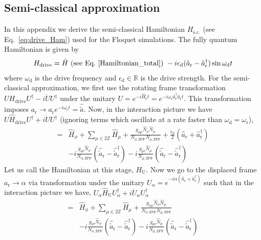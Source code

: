 \documentclass[%
reprint,
superscriptaddress,
 amsmath,amssymb,
 aps,
 prx,
longbibliography,
floatfix,
]{revtex4-2}
\begin{document}
{\subsection{Semi-classical approximation}\label{app:semi-classical}
In this appendix we derive the semi-classical Hamiltonian $H_\textrm{s.c.}$ (see Eq.~\ref{eq:drive_Ham}) used for the Floquet simulations. The fully quantum Hamiltonian is given by 
\begin{align}
    H_\textrm{drive}=\hat H \textrm{ (see Eq.~\ref{Hamiltonian_total}) }-i\epsilon_\textrm{d}(\hat a_\textrm{r}-\hat a_\textrm{r}^\dagger)\sin{\omega_\textrm{d} t}
\end{align}
where $\omega_\textrm{d}$ is the drive frequency and $\epsilon_\textrm{d}\in \mathbb{R}$ is the drive strength. For the semi-classical approximation, we first use the rotating frame transformation $UH_\textrm{drive}U^\dagger-i\dot{U}U^\dagger$ under the unitary $U=e^{-i\hat H_\textrm{r}t}=e^{-i\omega_\textrm{r} \hat a_\textrm{r}^\dagger \hat a_\textrm{r}t}$. This transformation imposes $a_\textrm{r}\rightarrow a_\textrm{r}e^{-i\omega_\textrm{r}t}=\hat{\tilde{a}}$. Now, in the interaction picture we have $U\hat H_\textrm{drive}U^\dagger+i\dot{U}U^\dagger$ (ignoring terms which oscillate at a rate faster than $\omega_\textrm{d}=\omega_\textrm{r}$),
\begin{align}
   =&\hat H_\phi+\sum_{\mu\in 2\mathbb{Z}}\hat H_\mu+\frac{g_{\phi\mu}\hat N_\phi\hat N_\mu}{N_{\phi,\textrm{ZPF}}N_{\mu,\textrm{ZPF}}}+\frac{\epsilon_\textrm{d}}{2}(\hat a_\textrm{r}+\hat a_\textrm{r}^\dagger)\nonumber\\ 
   &-i\frac{g_{\phi\textrm{r}}\hat N_\phi}{N_{\phi,\textrm{ZPF}}}(\hat {\tilde{a}}_\textrm{r}-\hat {\tilde{a}}_\textrm{r}^\dagger)-i\frac{g_{\mu\textrm{r}}\hat N_\mu}{N_{\mu,\textrm{ZPF}}}(\hat {\tilde{a}}_\textrm{r}-\hat {\tilde{a}}_\textrm{r}^\dagger)
\end{align}
Let us call the Hamiltonian at this stage, $H_\textrm{U}$. Now we go to the displaced frame $a_\textrm{r}\rightarrow \alpha$ via transformation under the unitary $U_\alpha=e^{-i\alpha(\hat a_\textrm{r}+\hat a_\textrm{r}^\dagger)}$ such that in the interaction picture we have, $U_\alpha\hat H_\textrm{U}U_\alpha^\dagger+i\dot{U}_\alpha U_\alpha^\dagger$ 
\begin{align}
   =&\hat H_\phi+\sum_{\mu\in 2\mathbb{Z}}\hat H_\mu+\frac{g_{\phi\mu}\hat N_\phi\hat N_\mu}{N_{\phi,\textrm{ZPF}}N_{\mu,\textrm{ZPF}}}\label{bare}\\ 
   &-i\frac{g_{\phi\textrm{r}}\hat N_\phi}{N_{\phi,\textrm{ZPF}}}(\hat {\tilde{a}}_\textrm{r}-\hat {\tilde{a}}_\textrm{r}^\dagger)-i\frac{g_{\mu\textrm{r}}\hat N_\mu}{N_{\mu,\textrm{ZPF}}}(\hat {\tilde{a}}_\textrm{r}-\hat {\tilde{a}}_\textrm{r}^\dagger)\label{quantum}\\

\end{align}}
\end{document}
